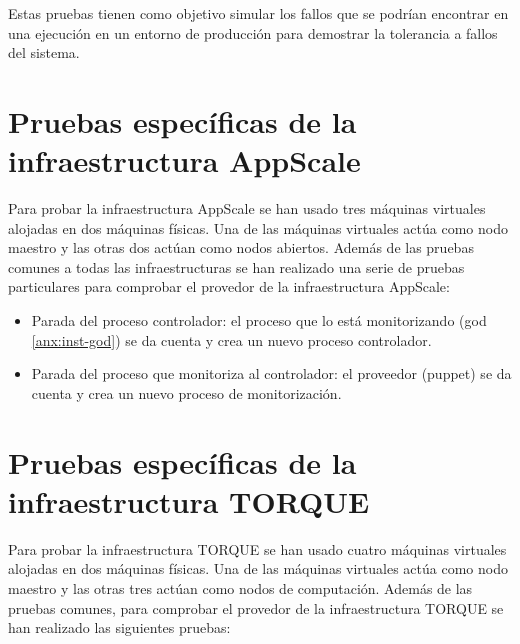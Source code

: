 Estas pruebas tienen como objetivo simular los fallos que se podrían encontrar en una ejecución en un entorno de producción para demostrar la tolerancia a fallos del sistema.


\section{Pruebas específicas de la infraestructura AppScale}

Para probar la infraestructura AppScale se han usado tres máquinas virtuales alojadas en dos máquinas físicas. Una de las máquinas virtuales actúa como nodo maestro y las otras dos actúan como nodos abiertos. Además de las pruebas comunes a todas las infraestructuras se han realizado una serie de pruebas particulares para comprobar el provedor de la infraestructura AppScale:

\begin{itemize}
\item Parada del proceso controlador: el proceso que lo está monitorizando (god \ref{anx:inst-god}) se da cuenta y crea un nuevo proceso controlador.
\item Parada del proceso que monitoriza al controlador: el proveedor (puppet) se da cuenta y crea un nuevo proceso de monitorización.
\end{itemize}


\section{Pruebas específicas de la infraestructura TORQUE}

Para probar la infraestructura TORQUE se han usado cuatro máquinas virtuales alojadas en dos máquinas físicas. Una de las máquinas virtuales actúa como nodo maestro y las otras tres actúan como nodos de computación. Además de las pruebas comunes, para comprobar el provedor de la infraestructura TORQUE se han realizado las siguientes pruebas:


